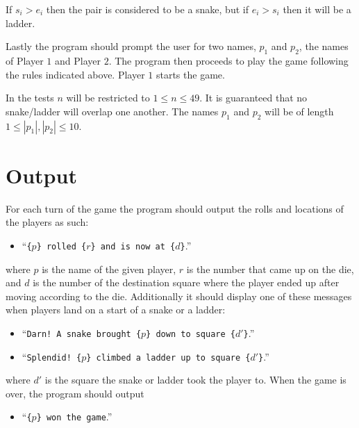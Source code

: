 If $s_i > e_i$ then the pair is considered to be a snake,
but if $e_i > s_i$ then it will be a ladder.

Lastly the program should prompt the user for two names, $p_1$ and $p_2$,
the names of Player $1$ and Player $2$.
The program then proceeds to play the game following the rules indicated above.
Player $1$ starts the game.

In the tests $n$ will be restricted to $1 \le n \le 49$.
It is guaranteed that no snake/ladder will overlap one another.
The names $p_1$ and $p_2$ will be of length $1 \le |p_1|, |p_2| \le 10$.

\section*{Output}

For each turn of the game the program should output the rolls and locations of the players as such:
\begin{itemize}
    \item ``\texttt{\{$p$\} rolled \{$r$\} and is now at \{$d$\}}.''
\end{itemize}
where $p$ is the name of the given player, $r$ is the number that came up on the die,
and $d$ is the number of the destination square where the player ended up after moving according to the die.
Additionally it should display one of these messages when players land on a start of a snake or a ladder:
\begin{itemize}
    \item ``\texttt{Darn! A snake brought \{$p$\} down to square \{$d'$\}}.''
    \item ``\texttt{Splendid! \{$p$\} climbed a ladder up to square \{$d'$\}}.''
\end{itemize}
where $d'$ is the square the snake or ladder took the player to.
When the game is over, the program should output
\begin{itemize}
    \item ``\texttt{\{$p$\} won the game}.''
\end{itemize}

